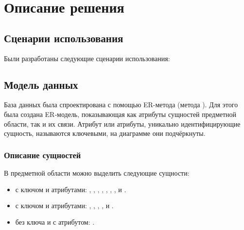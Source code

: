 
\section{Описание решения}

\subsection{Сценарии использования}

\tab
Были разработаны следующие сценарии использования:

\vspace{\baselineskip}

\subsection{Модель данных}

\tab
База данных была спроектирована с помощью ER-метода (метода ).
Для этого была создана ER‐модель, показывающая как атрибуты сущностей предметной области, так и их связи.
Атрибут или атрибуты, уникально идентифицирующие сущность, называются ключевыми, на диаграмме они подчёркнуты.

\subsubsection{Описание сущностей}

\tab
В предметной области можно выделить следующие сущности:
\begin{itemize}[topsep=0pt, parsep=0pt, itemsep=0pt, leftmargin=*, labelindent=0.5cm]
	\item {} с ключом  и атрибутами: , , , , , , ,  и .
	\item {} с ключом  и атрибутами: , , , ,  и .
	\item {} без ключа и с атрибутом: .
\end{itemize}

